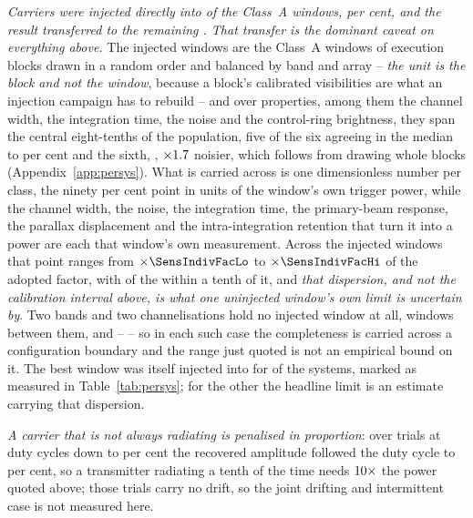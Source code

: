 \emph{Carriers were injected directly into \SensNInj{} of the \NWinA{} Class~A
windows, \SensNInjPct{} per cent, and the result transferred to the remaining
\SensNTransfer. That transfer is the dominant caveat on everything above.} The
injected windows are the Class~A windows of execution blocks drawn in a random
order and balanced by band and array -- \emph{the unit is the block and not the
window}, because a block's calibrated visibilities are what an injection
campaign has to rebuild -- and over \RpNAxis{} properties, among them the
channel width, the integration time, the noise and the control-ring brightness,
they span the central eight-tenths of the population, five of the six agreeing
in the median to \RpCovOtherPct{} per cent and the sixth, \RpCovWorstAxis,
$\times1.7$ noisier, which follows from drawing whole blocks
(Appendix~\ref{app:persys}). What is carried across is one dimensionless number
per class, the ninety per cent point in units of the window's own trigger
power, while the channel width, the noise, the integration time, the
primary-beam response, the parallax displacement and the intra-integration
retention that turn it into a power are each that window's own
measurement. Across the injected windows that point ranges from
$\times\SensIndivFacLo$ to $\times\SensIndivFacHi$ of the adopted factor, with
\NmDispNTenth{} of the \SensNInj{} within a tenth of it, and \emph{that
dispersion, and not the calibration interval above, is what one uninjected
window's own limit is uncertain by}. Two bands and two channelisations hold no
injected window at all, \NgNExtrapWin{} windows between them, and
\NgExtrapTakeClause{} -- \NgExtrapSys{} -- so in each such case the
completeness is carried across a configuration boundary and the range just
quoted is not an empirical bound on it. The best window was
itself injected into for \SmcNMeasSys{} of the \NSysALim{} systems, marked as
measured in Table~\ref{tab:persys}; for the other \SmcNEstSys{} the headline
limit is an estimate carrying that dispersion.

\emph{A carrier that is not always radiating is penalised in proportion}: over
\DutyNTrial{} trials at duty cycles down to \DutyCycleMinPct{} per cent the
recovered amplitude followed the duty cycle to \DutyAttenDevPct{} per cent, so
a transmitter radiating a tenth of the time needs $10\times$ the power
quoted above; those trials carry no drift, so the joint drifting and
intermittent case is not measured here.

\begin{table}
\centering
\scriptsize
\caption{What sets $\mathrm{EIRP}_{90}$, and in which direction. The
calibration interval applies to the class-average factor and so to any
statistic over many windows; the spread between windows is an observed
dispersion and is the statement about one window; the signed terms are biases
and are not folded into an error bar (\S\ref{sec:pninetysel}).}
\label{tab:p90budget}
\setlength{\tabcolsep}{2pt}

\end{table}


